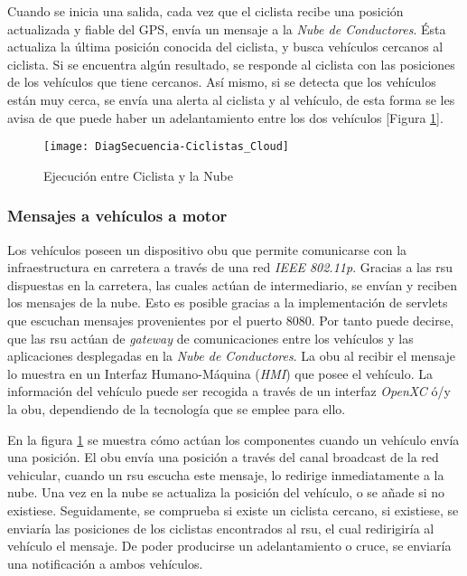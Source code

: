 Cuando se inicia una salida, cada vez que el ciclista recibe una posición actualizada
y fiable del GPS, envía un mensaje a la \emph{Nube de Conductores}. Ésta actualiza
la última posición conocida del ciclista, y busca vehículos cercanos al ciclista. Si se
encuentra algún resultado, se responde al ciclista con las posiciones de los vehículos
que tiene cercanos. Así mismo, si se detecta que los vehículos están muy cerca, se
envía una alerta al ciclista y al vehículo, de esta forma se les avisa de que puede haber
un adelantamiento entre los dos vehículos [Figura \ref{fig:DiagSecuencia-OBU_Cloud}].
\begin{figure}[H]
	\begin{center}
		\texttt{[image: DiagSecuencia-Ciclistas\_Cloud]}
		\caption{Ejecución entre Ciclista y la Nube}
		\label{fig:DiagSecuencia-OBU_Cloud}
	\end{center}
\end{figure}

\subsubsection{Mensajes a vehículos a motor}\label{sssection:mensajesvehiculomotor}
Los vehículos poseen un dispositivo \gls{obu} que permite comunicarse con la infraestructura
en carretera a través de una red \emph{IEEE 802.11p}. Gracias a las \gls{rsu} dispuestas
en la carretera, las cuales actúan de intermediario, se envían y reciben los mensajes
de la nube. Esto es posible gracias a la implementación de servlets que escuchan mensajes
provenientes por el puerto 8080. Por tanto puede decirse, que las \gls{rsu} actúan de
\emph{gateway} de comunicaciones entre los vehículos y las aplicaciones desplegadas
en la \emph{Nube de Conductores}. La \gls{obu} al recibir el mensaje lo muestra en
un Interfaz Humano-Máquina (\emph{HMI}) que posee el vehículo. La información del vehículo
puede ser recogida a través de un interfaz \emph{OpenXC} ó/y la \gls{obu}, dependiendo
de la tecnología que se emplee para ello.

En la figura \ref{fig:DiagSecuencia-OBU_Cloud} se muestra cómo actúan los componentes
cuando un vehículo envía una posición. El \gls{obu} envía una posición a través del canal
broadcast de la red vehicular, cuando un \gls{rsu} escucha este mensaje, lo redirige inmediatamente
a la nube. Una vez en la nube se actualiza la posición del vehículo, o se añade si no existiese.
Seguidamente, se comprueba si existe un ciclista cercano, si existiese, se enviaría las posiciones
de los ciclistas encontrados al \gls{rsu}, el cual redirigiría al vehículo el mensaje. De poder producirse
un adelantamiento o cruce, se enviaría una notificación a ambos vehículos.

